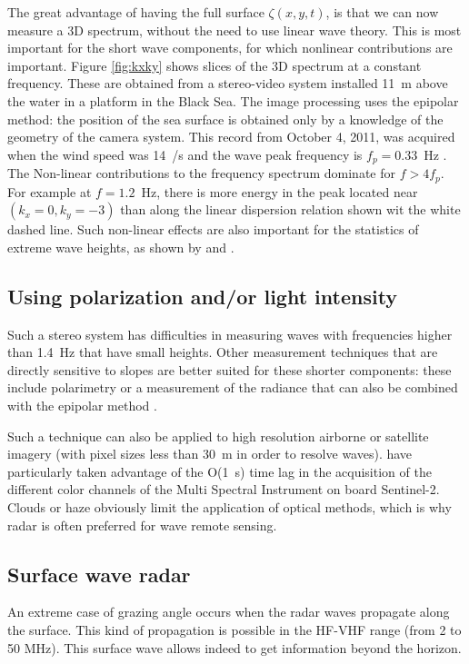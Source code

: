 The great advantage of having the full surface $\zeta(x,y,t)$, is that we can now measure a 3D spectrum, without the need to use linear wave theory. 
This is most important for the short wave components, for which nonlinear contributions are important. Figure \ref{fig:kxky} shows slices of the 3D spectrum 
at a constant frequency. These are obtained from a stereo-video system installed 11~m above the water in a platform in the Black Sea. The image processing 
uses the epipolar method: the position of the sea surface is obtained only by a knowledge of the geometry of the camera system.
This record from October 4, 2011, was acquired when the wind speed was 14~/s and the wave  peak frequency is $f_p=0.33$~Hz \citep{Leckler&al.2015}. The 
Non-linear contributions to the frequency spectrum dominate for $f > 4 f_p$. For example at $f=1.2$~Hz, there is more energy in the peak located near $(k_x=0,k_y=-3)$ 
than along the linear dispersion relation shown wit the white dashed line. 
Such non-linear effects are also important for the statistics of extreme wave heights, as shown by \cite{Fedele&al.2013} and \cite{Benetazzo&al.2017}.



\subsection{Using polarization and/or light intensity}
Such a stereo system has difficulties in measuring waves with frequencies higher than 1.4~Hz that have small heights. Other measurement techniques that 
are directly sensitive to slopes are better suited for these shorter components: these include polarimetry \citep{Zappa&al.2008} or a measurement of 
the radiance that can also be combined with the epipolar method \citep{Gallego&al.2011,Yurovskaya&al.2013}. 

Such a technique can also be applied to high resolution airborne or satellite imagery (with pixel sizes less than 30~m in order to resolve waves). 
\cite{Kudryavtsev&al.2017} have particularly taken advantage of the O(1~s) time lag in the acquisition of the different color channels of the Multi Spectral Instrument 
on board Sentinel-2. Clouds or haze obviously limit the application of optical methods, which is why radar is often preferred for wave remote sensing. 



\subsection{Surface wave radar}
An extreme case of grazing angle occurs when the radar waves propagate along the surface. This kind of propagation is possible
in the HF-VHF range (from 2 to 50 MHz). This surface wave allows indeed to get information beyond the horizon. 

